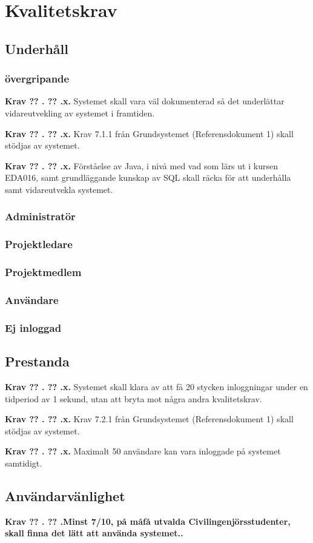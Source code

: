 \documentclass[a4paper]{article}
\newcommand\getcurrentref[1]{%
 \ifnumequal{\value{#1}}{0}
  {??}
  {\the\value{#1}}%
}
\newcommand\requirement[2]{
	\numberedrow{Krav}{#1}{#2}
}
\newcommand\numberedrow[3]{
	\noindent
	\textbf{#1 \getcurrentref{section}.\getcurrentref{subsection}.#2.} #3
	
}
\begin{document}
\section{Kvalitetskrav}
\subsection{Underhåll}
\subsubsection*{övergripande}
\requirement{x}{Systemet skall vara väl dokumenterad så det underlättar vidareutvekling av systemet i framtiden.}
\requirement{x}{Krav 7.1.1 från Grundsystemet (Referensdokument 1) skall stödjas av systemet.}
\requirement{x}{Förståelse av Java, i nivå med vad som lärs ut i kursen EDA016, samt grundläggande kunskap av SQL skall räcka för att underhålla samt vidareutvekla systemet.}

		\subsubsection*{Administratör}
		\subsubsection*{Projektledare}
		\subsubsection*{Projektmedlem}
		\subsubsection*{Användare}
		\subsubsection*{Ej inloggad}


	\subsection{Prestanda}
		\label{krav-kval-pres}
		\requirement{x}{Systemet skall klara av att få 20 stycken inloggningar under en tidperiod av 1 sekund, utan att bryta mot några andra kvalitetskrav.}
		\requirement{x}{Krav 7.2.1 från Grundsystemet (Referensdokument 1) skall stödjas av systemet.	}
		\requirement{x}{Maximalt 50 användare kan vara inloggade på systemet samtidigt.}

	\subsection{Användarvänlighet}
		\requirement{Minst 7/10, på måfå utvalda Civilingenjörsstudenter, skall finna det lätt att använda systemet.}
\end{document}
